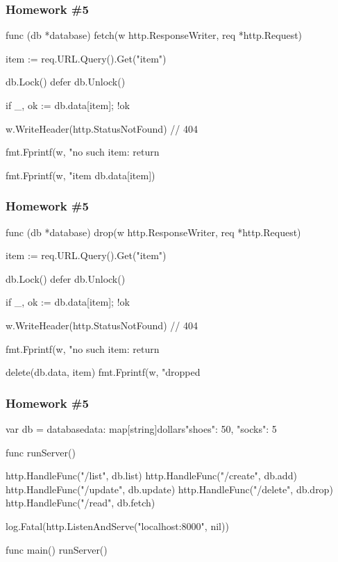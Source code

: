 \documentclass[handout,compress,t,11pt]{beamer}
\begin{document}
\begin{frame}[fragile]
    \frametitle{Homework \#5}
\begin{golang}
func (db *database) fetch(w http.ResponseWriter, 
                          req *http.Request) {
	item := req.URL.Query().Get("item")

	db.Lock()
	defer db.Unlock()

	if _, ok := db.data[item]; !ok {
		w.WriteHeader(http.StatusNotFound) // 404

		fmt.Fprintf(w, "no such item: %
		return
	}

	fmt.Fprintf(w, "item %
                db.data[item])
}
\end{golang}
\end{frame}

\begin{frame}[fragile]
    \frametitle{Homework \#5}
\begin{golang}
func (db *database) drop(w http.ResponseWriter, 
                         req *http.Request) {
	item := req.URL.Query().Get("item")

	db.Lock()
	defer db.Unlock()

	if _, ok := db.data[item]; !ok {
		w.WriteHeader(http.StatusNotFound) // 404

		fmt.Fprintf(w, "no such item: %
		return
	}

	delete(db.data, item)
	fmt.Fprintf(w, "dropped %
}
\end{golang}
\end{frame}

\begin{frame}[fragile]
    \frametitle{Homework \#5}
\begin{golang}
var db = database{data: map[string]dollars{"shoes": 50,
                                           "socks": 5}}

func runServer() {
	http.HandleFunc("/list", db.list)
	http.HandleFunc("/create", db.add)
	http.HandleFunc("/update", db.update)
	http.HandleFunc("/delete", db.drop)
	http.HandleFunc("/read", db.fetch)

	log.Fatal(http.ListenAndServe("localhost:8000", nil))
}

func main() {
	runServer()
}
\end{golang}
\end{frame}

\end{document}
